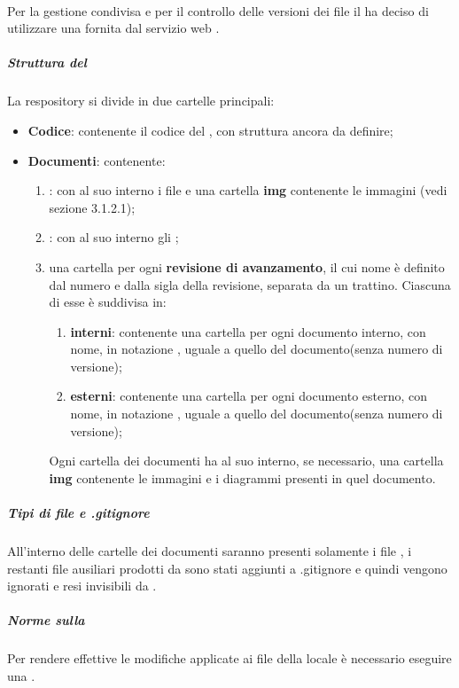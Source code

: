 	\paragraph{}
	\label{sec:4.1.3.1}
		Per la gestione condivisa e per il controllo delle versioni dei file il  ha deciso di utilizzare una  fornita dal servizio web .
		\subparagraph{Struttura del }
		\label{sec:4.1.3.1.1}
			La respository si divide in due cartelle principali:
			\begin{itemize}
				\item \textbf{Codice}: contenente il codice del , con struttura ancora da definire;
				\item \textbf{Documenti}: contenente:
				\begin{enumerate}
					\item \textbf{}: con al suo interno i file  e una cartella \textbf{img} contenente le immagini (vedi sezione 3.1.2.1);
					\item \textbf{}: con al suo interno gli ;
					\item una cartella per ogni \textbf{revisione di avanzamento}, il cui nome è definito dal numero e dalla sigla della revisione, separata da un trattino. Ciascuna di esse è suddivisa in:
					\begin{enumerate}
						\item \textbf{interni}: contenente una cartella per ogni documento interno, con nome, in notazione , uguale a quello del documento(senza numero di versione);
						\item \textbf{esterni}: contenente una cartella per ogni documento esterno, con nome, in notazione , uguale a quello del documento(senza numero di versione);
					\end{enumerate}
					Ogni cartella dei documenti ha al suo interno, se necessario, una cartella \textbf{img} contenente le immagini e i diagrammi presenti in quel documento.
				\end{enumerate}
			\end{itemize}
		\subparagraph{Tipi di file e .gitignore}
		\label{sec:4.1.3.1.2}
			All'interno delle cartelle dei documenti saranno presenti solamente i file , i restanti file ausiliari prodotti da \gl{\LaTeX} sono stati aggiunti a .gitignore e quindi vengono ignorati e resi invisibili da .
		\subparagraph{Norme sulla }
		\label{sec:4.1.3.1.3}
			Per rendere effettive le modifiche applicate ai file della  locale è necessario eseguire una \textbf{}.
